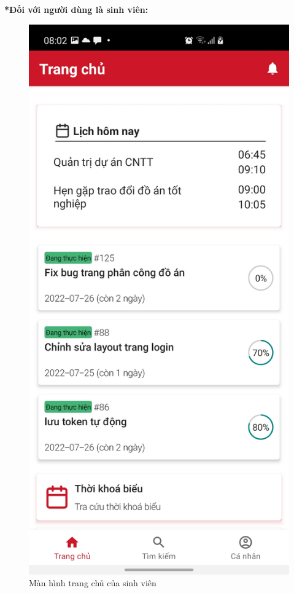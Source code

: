 \documentclass[../Main.tex]{subfiles}
\begin{document}
\newpage
\textbf{*Đối với người dùng là sinh viên:}
\begin{figure}[H]
\begin{minipage}{0.5\textwidth}
\includegraphics[width=0.60\linewidth]{Figure/screen/home_student.jpg}
\caption{Màn hình trang chủ của sinh viên} \label{fig:screen_login}
\end{minipage}
\hspace{\fill}
\begin{minipage}{0.5\textwidth}

\end{minipage}
\end{figure}
\end{document}
